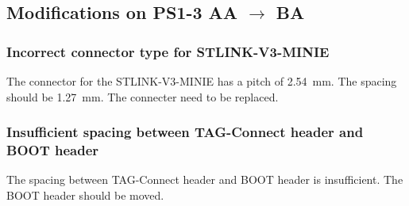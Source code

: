 \subsection{Modifications on PS1-3 AA $\to$ BA}

\subsubsection{Incorrect connector type for STLINK-V3-MINIE}
The connector for the STLINK-V3-MINIE has a pitch of \qty{2.54}{\milli\meter}. The spacing should be \qty{1.27}{\milli\meter}. The connecter need to be replaced. 

\subsubsection{Insufficient spacing between TAG-Connect header and BOOT header}
The spacing between TAG-Connect header and BOOT header is insufficient. The BOOT header should be moved. 

